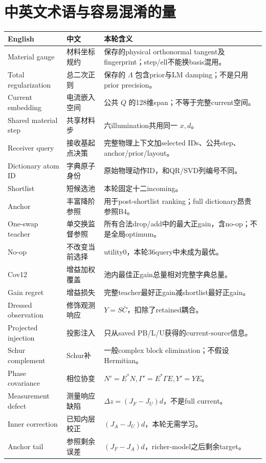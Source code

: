 \documentclass[UTF8,11pt,a4paper,fontset=fandol]{ctexart}
\begin{document}
\appendix\section{中英文术语与容易混淆的量}
\small
\begin{longtable}{p{.26\linewidth}p{.24\linewidth}p{.42\linewidth}}
\toprule English & 中文 & 本轮含义\\\midrule\endhead
Material gauge & 材料坐标规约 & 保存的physical orthonormal tangent及fingerprint；step/ell不能换basis混用。\\
Total regularization & 总二次正则 & 保存的 $\Lambda$ 包含prior与LM damping；不是只用prior precision。\\
Current embedding & 电流嵌入空间 & 公共 $Q$ 的128维span；不等于完整current空间。\\
Shared material step & 共享材料步 & 六illumination共用同一 $x,d$。\\
Receiver query & 接收基起点决策 & 完整物理上下文加selected IDs、公共step、anchor/prior/layout。\\
Dictionary atom ID & 字典原子身份 & 原始物理动作ID，和QR/SVD列编号不同。\\
Shortlist & 短候选池 & 本轮固定十二incoming。\\
Anchor & 丰富降阶参照 & 用于post-shortlist ranking；full dictionary昂贵参照B4。\\
One-swap teacher & 单交换监督参照 & 所有合法drop/add中的最大正gain，含no-op；不是全局optimum。\\
No-op & 不改变当前选择 & utility0，本轮36query中未成为最优。\\
Cov12 & 增益加权覆盖 & 池内最佳正gain总量相对完整字典总量。\\
Gain regret & 增益损失 & 完整teacher最好正gain减shortlist最好正gain。\\
Dressed observation & 修饰观测响应 & $Y=S\bar C$，扣除了retained耦合。\\
Projected injection & 投影注入 & 只从saved PB/L/U获得的current-source信息。\\
Schur complement & Schur补 & 一般complex block elimination；不假设Hermitian。\\
Phase covariance & 相位协变 & $N'=E^*N,\Gamma'=E^*\Gamma E,Y'=YE$。\\
Measurement defect & 测量响应缺陷 & $\Delta z=(J_F-J_U)d$，不是full current。\\
Inner correction & 已知内层校正 & $(J_A-J_U)d$，本轮无需学习。\\
Anchor tail & 参照剩余误差 & $(J_F-J_A)d$，richer-model之后剩余target。\\

\end{longtable}
\end{document}
